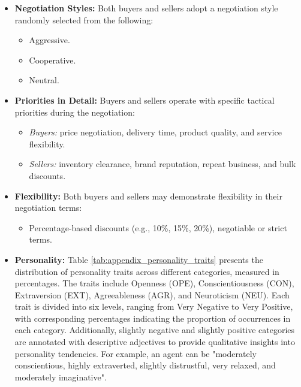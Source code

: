 \begin{itemize}
    \item \textbf{Negotiation Styles:} Both buyers and sellers adopt a negotiation style randomly selected from the following:
    \begin{itemize}
        \item Aggressive.
        \item Cooperative.
        \item Neutral.
    \end{itemize}

    \item \textbf{Priorities in Detail:}  
    Buyers and sellers operate with specific tactical priorities during the negotiation:
    \begin{itemize}
        \item \textit{Buyers:} price negotiation, delivery time, product quality, and service flexibility.
        \item \textit{Sellers:} inventory clearance, brand reputation, repeat business, and bulk discounts.
    \end{itemize}

    \item \textbf{Flexibility:}  
    Both buyers and sellers may demonstrate flexibility in their negotiation terms:
    \begin{itemize}
        \item Percentage-based discounts (e.g., 10\%, 15\%, 20\%), negotiable or strict terms.
    \end{itemize}

    \item \textbf{Personality:}  
    Table \ref{tab:appendix_personality_traits} presents the distribution of personality traits across different categories, measured in percentages. The traits include Openness (OPE), Conscientiousness (CON), Extraversion (EXT), Agreeableness (AGR), and Neuroticism (NEU). Each trait is divided into six levels, ranging from Very Negative to Very Positive, with corresponding percentages indicating the proportion of occurrences in each category. Additionally, slightly negative and slightly positive categories are annotated with descriptive adjectives to provide qualitative insights into personality tendencies. For example, an agent can be "moderately conscientious, highly extraverted, slightly distrustful, very relaxed, and moderately imaginative".
\end{itemize}

